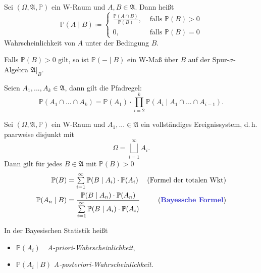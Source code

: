 \documentclass{cheat-sheet}
\newcommand{\Alg}{\mathfrak{A}} %
\renewcommand{\P}{\mathbb{P}} %
\begin{document}


\begin{defn}
  Sei $(\Omega, \Alg, \P)$ ein W-Raum und $A, B \in \Alg$. Dann heißt
  \[ \P(A \mid B) \coloneqq \begin{cases} \tfrac{\P(A \cap B)}{\P(B)}, & \text{ falls } \P(B) > 0 \\
  0, & \text{ falls } \P(B) = 0 \end{cases} \]
  Wahrscheinlichkeit von $A$ unter der Bedingung $B$.
\end{defn}

\begin{bem}
  Falls $\P(B) > 0$ gilt, so ist $\P(- \mid B)$ ein W-Maß über $B$ auf der Spur-$\sigma$-Algebra $\Alg|_B$.
\end{bem}

\begin{lem}
  Seien $A_1, ..., A_k \in \Alg$, dann gilt die Pfadregel:
  \[ \P(A_1 \cap ... \cap A_k) = \P(A_1) \cdot \prod_{i=2}^k \P(A_i \mid A_1 \cap ... \cap A_{i-1}). \]
\end{lem}





\begin{satz}
  Sei $(\Omega, \Alg, \P)$ ein W-Raum und $A_1, ... \in \Alg$ ein vollständiges Ereignissystem, d.\,h. paarweise disjunkt mit
  \[ \Omega = \bigsqcup_{i = 1}^\infty A_i. \]
  Dann gilt für jedes $B \in \Alg$ mit $\P(B) > 0$
  \begin{align*}
    \P(B) &= \sum_{i=1}^{\infty} \P(B \mid A_i) \cdot \P(A_i) & \text{(Formel der totalen Wkt)} \\
    \P(A_n \mid B) &= \frac{\P(B \mid A_n) \cdot \P(A_n)}{\sum_{i=1}^\infty \P(B \mid A_i) \cdot \P(A_i)} & \text{(\emph{Bayessche Formel})}
  \end{align*}
\end{satz}


\begin{sprech}
  In der Bayesischen Statistik heißt
  \begin{itemize}
    \item $\P(A_i)$ \quad \,\, \emph{A-priori-Wahrscheinlichkeit},
    \item $\P(A_i \mid B)$ \emph{A-posteriori-Wahrscheinlichkeit}.
  \end{itemize}
\end{sprech}
\end{document}
